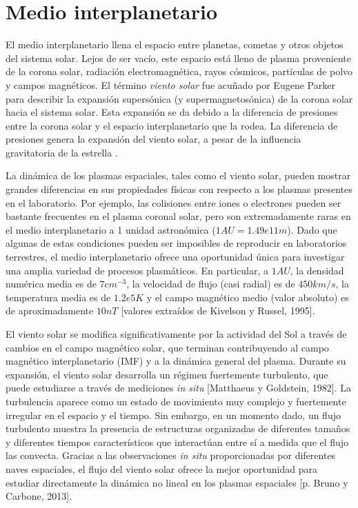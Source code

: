 \section{Medio interplanetario}
El medio interplanetario llena el espacio entre planetas, cometas y
otros objetos del sistema solar. Lejos de ser vacío, este espacio está
lleno de plasma proveniente de la corona solar, radiación
electromagnética, rayos cósmicos, partículas de polvo y campos
magnéticos. El término \emph{viento solar} fue acuñado por Eugene
Parker \cite{Parker1958} para describir la expansión supersónica (y
supermagnetosónica) de la corona solar hacia el sistema solar. Esta
expansión se da debido a la diferencia de presiones entre la corona
solar y el espacio interplanetario que la rodea. La diferencia de
presiones genera la expansión del viento solar, a pesar de la
influencia gravitatoria de la estrella \cite{KivelsonYRussel1995}.

La dinámica de los plasmas espaciales, tales como el viento solar,
pueden mostrar grandes diferencias en sus propiedades físicas con
respecto a los plasmas presentes en el laboratorio. Por ejemplo, las
colisiones entre iones o electrones pueden ser bastante frecuentes en
el plasma coronal solar, pero son extremadamente raras en el medio
interplanetario a 1 unidad astronómica ($\si{1}{AU} =
\si{1.49e11}{m}$). Dado que algunas de estas condiciones pueden ser
imposibles de reproducir en laboratorios terrestres, el medio
interplanetario ofrece una oportunidad única para investigar una
amplia variedad de procesos plasmáticos. En particular, a
$\si{1}{AU}$, la densidad numérica media es de $\si{7}{cm^{-3}}$, la
velocidad de flujo (casi radial) es de $\si{450}{km/s}$, la
temperatura media es de $\si{1.2e5}{K}$ y el campo magnético medio
(valor absoluto) es de aproximadamente $\si{10}{nT}$ [valores
  extraídos de Kivelson y Russel, 1995].

El viento solar se modifica significativamente por la actividad del
Sol a través de cambios en el campo magnético solar, que terminan
contribuyendo al campo magnético interplanetario (IMF) y a la dinámica
general del plasma. Durante su expansión, el viento solar desarrolla
un régimen fuertemente turbulento, que puede estudiarse a través de
mediciones \emph{in situ} [Matthaeus y Goldstein, 1982]. La
turbulencia aparece como un estado de movimiento muy complejo y
fuertemente irregular en el espacio y el tiempo. Sin embargo, en un
momento dado, un flujo turbulento muestra la presencia de estructuras
organizadas de diferentes tamaños y diferentes tiempos característicos
que interactúan entre sí a medida que el flujo las convecta. Gracias a
las observaciones \emph{in situ} proporcionadas por diferentes naves
espaciales, el flujo del viento solar ofrece la mejor oportunidad para
estudiar directamente la dinámica no lineal en los plasmas espaciales
[p. Bruno y Carbone, 2013].

